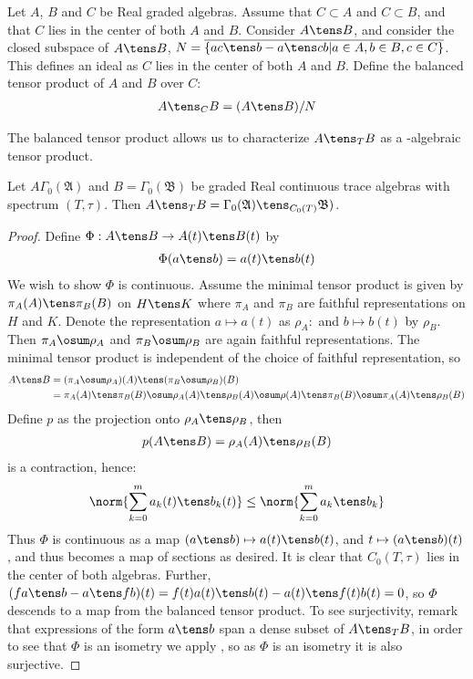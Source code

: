 \begin{definition}
	Let $A$, $B$ and $C$ be Real graded \Cstar algebras. Assume that $C\subset A$ and $C\subset B$, and that $C$ lies in the center of both $A$ and $B$. Consider $A\tens B$, and consider the closed subspace of $A\tens B$, $N=\overline{\{ac\tens b-a\tens cb | a\in A, b\in B, c\in C\}}$. This defines an ideal as $C$ lies in the center of both $A$ and $B$. Define the balanced tensor product of $A$ and $B$ over $C$:
	\begin{align*}
		A\tens_C B = (A\tens B)/N
	\end{align*}
\end{definition}
The balanced tensor product allows us to characterize $A\tens_T B$ as a \Cstar-algebraic tensor product. 
\begin{proposition}
	Let $A\Gamma_0(\mathfrak{A})$ and $B=\Gamma_0(\mathfrak{B})$ be graded Real continuous trace algebras with spectrum $(T,\tau)$. Then $A\tens_T B=\Gamma_0(\mathfrak{A})\tens_{C_0(T)} \mathfrak{B})$.
\end{proposition}
\begin{proof}
	Define $\Phi:A\tens B\to A(t) \tens B(t)$ by
	\begin{align*}
		\Phi(a\tens b)=a(t)\tens b(t)
	\end{align*}
	We wish to show $\Phi$ is continuous. Assume the minimal tensor product is given by $\pi_A(A)\tens \pi_B(B)$ on $H\tens K$ where $\pi_A$ and $\pi_B$ are faithful representations on $H$ and $K$. 
	Denote the representation $a\mapsto a(t)$ as $\rho_A:$ and $b\mapsto b(t)$ by $\rho_B$. Then $\pi_A \osum \rho_A$ and $\pi_B \osum \rho_B$ are again faithful representations. The minimal tensor product is independent of the choice of faithful representation, so 
	\begin{align*}
		A\tens B&= (\pi_A \osum \rho_A)(A)\tens (\pi_B \osum \rho_B)(B) \\
		&=\pi_A(A) \tens \pi_B(B) \osum \rho_A(A)\tens \rho_B(A) \osum \rho(A)\tens \pi_B(B)\osum \pi_A(A)\tens \rho_B(B)
	\end{align*}
	Define $p$ as the projection onto $\rho_A\tens \rho_B$, then 
	\begin{align*}
		p(A\tens B)=\rho_A(A) \tens \rho_B(B)
	\end{align*}
	is a contraction, hence:
	\begin{align*}
		\norm{\sum_{k=0}^m a_k(t) \tens b_k(t)} \leq \norm{\sum_{k=0}^m a_k \tens b_k}
	\end{align*}
	Thus $\Phi$ is continuous as a map $(a\tens b)\mapsto a(t)\tens b(t)$, and $t\mapsto (a\tens b)(t)$, and thus becomes a map of sections as desired. It is clear that $C_0(T,\tau)$ lies in the center of both algebras. Further, $(f a\tens b-a\tens f b)(t)=f(t)a(t)\tens b(t)-a(t)\tens f(t) b(t)=0$, so $\Phi$ descends to a map from the balanced tensor product. To see surjectivity, remark that expressions of the form $a\tens b$ span a dense subset of $A\tens_T B$,  in order to see that $\Phi$ is an isometry we apply , so as $\Phi$ is an isometry it is also surjective.
\end{proof}
